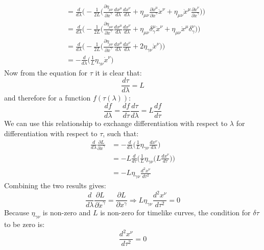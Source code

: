 \documentclass[9pt]{report}
\begin{document}
\begin{enumerate}
\[\begin{align}
                                                                    &= \frac{d}{d\lambda} \Big( -\frac{1}{2L} \Big(\frac{\partial\eta_{\mu\nu}}{\partial \dot{x}^\gamma}\frac{dx^\mu}{d\lambda} \frac{dx^\nu}{d\lambda} + \eta_{\mu\nu} \frac{\partial\dot{x}^\mu}{\partial\dot{x}^\gamma} \dot{x}^\nu + \eta_{\mu\nu} \dot{x}^\mu \frac{\partial\dot{x}^\nu}{\partial\dot{x}^\gamma} \Big) \Big) \\
                                                                    &= \frac{d}{d\lambda} \Big( -\frac{1}{2L} \Big(\frac{\partial\eta_{\mu\nu}}{\partial \dot{x}^\gamma}\frac{dx^\mu}{d\lambda} \frac{dx^\nu}{d\lambda} + \eta_{\mu\nu} \delta^\mu_\gamma \dot{x}^\nu + \eta_{\mu\nu} \dot{x}^\mu \delta^\nu_\gamma \Big) \Big) \\
                                                                    &= \frac{d}{d\lambda} \Big( -\frac{1}{2L} \Big(\frac{\partial\eta_{\mu\nu}}{\partial \dot{x}^\gamma}\frac{dx^\mu}{d\lambda} \frac{dx^\nu}{d\lambda} + 2 \eta_{\gamma\nu} \dot{x}^\nu \Big)\Big)\\
                                                                    &= - \frac{d}{d\lambda} \Big(\frac{1}{L}\eta_{\gamma\nu} \dot{x}^\nu \Big)
    \end{align}
  \]
  Now from the equation for $\tau$ it is clear that: 
  \[
    \frac{d\tau}{d\lambda} = L
  \]
  and therefore for a function $f(\tau(\lambda))$:
  \[
    \frac{df}{d\lambda} = \frac{df}{d\tau} \frac{d\tau}{d\lambda} = L \frac{df}{d\tau}
  \]
  We can use this relationship to exchange differentiation with respect to $\lambda$
  for differentiation with respect to $\tau$, such that:
  \[
    \begin{align}
      \frac{d}{d\lambda} \frac{\partial L}{\partial \dot{x}^\gamma} &= - \frac{d}{d\lambda} \Big(\frac{1}{L}\eta_{\gamma\nu} \frac{dx^\nu}{d\lambda} \Big) \\
                                                                    &= - L\frac{d}{d\tau} \Big(\frac{1}{L}\eta_{\gamma\nu} \Big(L\frac{dx^\nu}{d\tau} \Big)\Big) \\
                                                                    &= - L\eta_{\gamma\nu} \frac{d^2x^\nu}{d\tau^2}
    \end{align}
  \]
  Combining the two results gives:
  \[
    \frac{d}{d\lambda} \frac{\partial L}{\partial \dot{x}^\gamma} = \frac{\partial L}{\partial x^\gamma} \Rightarrow L \eta_{\gamma\nu} \frac{d^2x^\nu}{d\tau^2} = 0
  \]
  Because $\eta_{\gamma\nu}$ is non-zero and $L$ is non-zero for timelike curves, the condition for $\delta \tau$ to be zero is:
  \[
    \frac{d^2x^\nu}{d\tau^2} = 0
  \]
\end{enumerate}
\end{document}
